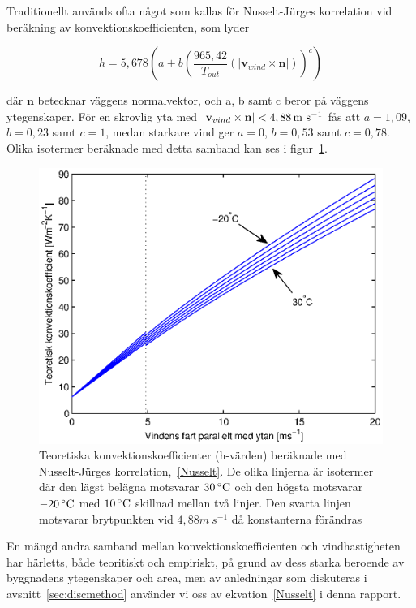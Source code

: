 Traditionellt används ofta något som kallas för Nusselt-Jürges korrelation vid beräkning av konvektionskoefficienten, som lyder

\begin{equation}\label{Nusselt}
h = 5,678 \left( a + b \left( \frac{965,42}{T_{out}}\left(|\mathbf{v}_{wind}\times \mathbf{n}|\right) \right)^c \right)
\end{equation}

där $\mathbf{n}$ betecknar väggens normalvektor, och a, b samt c beror på väggens ytegenskaper. För en skrovlig yta med $|\mathbf{v}_{vind}\times \mathbf{n}| < \unit[4,88]{m~s^{-1}}$ fås att $a=1,09$, $b=0,23$ samt $c=1$, medan starkare vind ger $a=0$, $b=0,53$ samt $c=0,78$. Olika isotermer beräknade med detta samband kan ses i figur~\ref{hvalues}.

\begin{figure}[hpbt]\centering
\includegraphics[scale=0.7]{images/hvalues.eps}
\caption{Teoretiska konvektionskoefficienter (h-värden) beräknade med Nusselt-Jürges korrelation,~\eqref{Nusselt}. De olika linjerna är isotermer där den lägst belägna motsvarar $\unit[30]{^{\circ}C}$ och den högsta motsvarar $\unit[-20]{^{\circ}C}$ med $\unit[10]{^{\circ}C}$ skillnad mellan två linjer. Den svarta linjen motsvarar brytpunkten vid $\unit{4,88}{m~s^{-1}}$ då konstanterna förändras}
\label{hvalues}
\end{figure}

En mängd andra samband mellan konvektionskoefficienten och vindhastigheten har härletts, både teoritiskt och empiriskt, på grund av dess starka beroende av byggnadens ytegenskaper och area, men av anledningar som diskuteras i avsnitt~\ref{sec:discmethod} använder vi oss av ekvation~\ref{Nusselt} i denna rapport.\cite{palyvos08}

